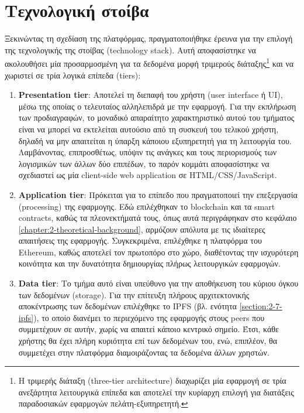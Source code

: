 \section{Τεχνολογική στοίβα} \label{section:3-2-technology-stack}

Ξεκινώντας τη σχεδίαση της πλατφόρμας, πραγματοποιήθηκε έρευνα για την επιλογή της τεχνολογικής της στοίβας (technology stack). Αυτή αποφασίστηκε να ακολουθήσει μία προσαρμοσμένη για τα δεδομένα μορφή τριμερούς διάταξης\footnote{Η τριμερής διάταξη (three-tier architecture) διαχωρίζει μία εφαρμογή σε τρία ανεξάρτητα λειτουργικά επίπεδα και αποτελεί την κυρίαρχη επιλογή για διατάξεις παραδοσιακών εφαρμογών πελάτη-εξυπηρετητή.} και να χωριστεί σε τρία λογικά επίπεδα (tiers):

\begin{enumerate}
    \item \textbf{Presentation tier}: Αποτελεί τη διεπαφή του χρήστη (user interface ή UI), μέσω της οποίας ο τελευταίος αλληλεπιδρά με την εφαρμογή. Για την εκπλήρωση των προδιαγραφών, το μοναδικό απαραίτητο χαρακτηριστικό αυτού του τμήματος είναι να μπορεί να εκτελείται αυτούσιο από τη συσκευή του τελικού χρήστη, δηλαδή να μην απαιτείται η ύπαρξη κάποιου εξυπηρετητή για τη λειτουργία του. Λαμβάνοντας, επιπροσθέτως, υπόψιν τις ανάγκες και τους περιορισμούς των λογισμικών των άλλων δύο επιπέδων, το παρόν κομμάτι αποφασίστηκε να σχεδιαστεί ως μία client-side web application σε HTML/CSS/JavaScript.

    \item \textbf{Application tier}: Πρόκειται για το επίπεδο που πραγματοποιεί την επεξεργασία (\textenglish{processing}) της εφαρμογης. Εδώ επιλέχθηκαν το blockchain και τα smart contracts, καθώς τα πλεονεκτήματά τους, όπως αυτά περιγράφηκαν στο κεφάλαιο \ref{chapter:2-theoretical-background}, αρμόζουν απόλυτα με τις ιδιαίτερες απαιτήσεις της εφαρμογής. Συγκεκριμένα, επιλέχθηκε η πλατφόρμα του Ethereum, καθώς αποτελεί τον πρωτοπόρο στο χώρο, διαθέτοντας την ισχυρότερη κοινότητα και την δυνατότητα δημιουργίας πλήρως λειτουργικών εφαρμογών.

    \item \textbf{Data tier}: Το τμήμα αυτό είναι υπεύθυνο για την αποθήκευση του κύριου όγκου των δεδομένων (storage). Για την επίτευξη πλήρους αρχιτεκτονικής αποκέντρωσης των δεδομένων επιλέχθηκε το IPFS (βλ. ενότητα \ref{section:2-7-ipfs}), το οποίο διανέμει το περιεχόμενο της εφαρμογής στους peers που συμμετέχουν σε αυτήν, χωρίς να απαιτεί κάποιο κεντρικό σημείο. Έτσι, κάθε χρήστης θα έχει πλήρη κυριότητα επί των δεδομένων του, ενώ, επιπλέον, θα συμμετέχει στην πλατφόρμα διαμοιράζοντας τα δεδομένα άλλων χρηστών.
\end{enumerate}

